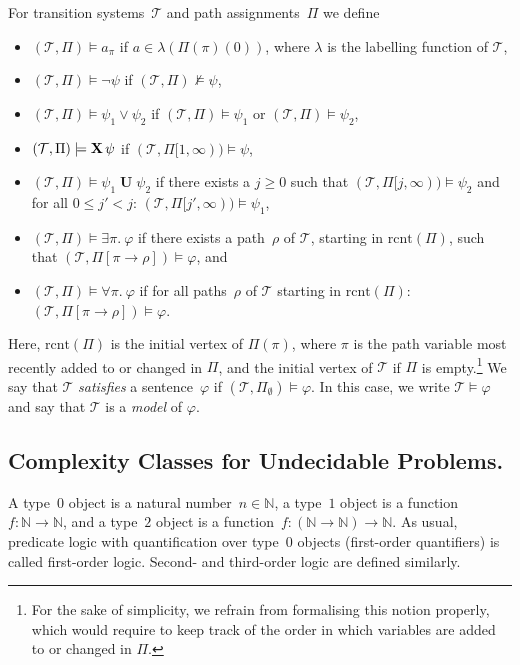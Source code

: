 \documentclass[dvipsnames,10pt,a4paper]{amsart}
\theoremstyle{definition}
\theoremstyle{remark}
\newcommand{\last}{\mathrm{rcnt}}
\newcommand{\nats}{\mathbb{N}}
\renewcommand{\phi}{\varphi}
\newcommand{\tsys}{\mathcal{T}}
\DeclareMathOperator{\U}{\mathbf{U}}
\newcommand{\X}{\mathop{\mathbf{X}\vphantom{a}}\nolimits}
\newcommand{\suffix}[2]{#1[#2,\infty)}
\renewcommand{\phi}{\varphi}
\begin{document}
 For transition systems~$\tsys$ and path assignments~$\Pi$ we define 
\begin{itemize}
	\item $(\tsys, \Pi) \models a_\pi$ if $a \in \lambda(\Pi(\pi)(0))$, where $\lambda$ is the labelling function of $\tsys$,
	\item $(\tsys, \Pi) \models \neg \psi$ if $(\tsys, \Pi) \not\models \psi$,
	\item $(\tsys, \Pi) \models \psi_1 \vee \psi_2 $ if $(\tsys, \Pi) \models \psi_1$ or $(\tsys, \Pi) \models \psi_2$,
	\item $(\tsys, \Pi) \models \X \psi$ if $(\tsys,\suffix{\Pi}{1}) \models \psi$,
	\item $(\tsys, \Pi) \models \psi_1 \U \psi_2$ if there exists a $j \ge 0$ such that $(\tsys,\suffix{\Pi}{j}) \models \psi_2$ and for all $0 \le j' < j$: $(\tsys,\suffix{\Pi}{j'}) \models \psi_1$, 
	\item $(\tsys, \Pi) \models \exists \pi.\ \phi$ if there exists a path~$\rho$ of $\tsys$, starting in $\last(\Pi)$, such that $(\tsys,\Pi[\pi \rightarrow \rho]) \models \phi$, and 
	\item $(\tsys, \Pi) \models \forall \pi.\ \phi$ if for all paths~$\rho$ of $\tsys$ starting in $\last(\Pi)$: $(\tsys,\Pi[\pi \rightarrow \rho]) \models \phi$. 
\end{itemize}
Here, $\last(\Pi)$ is the initial vertex of $\Pi(\pi)$, where $\pi$ is the path variable most recently added to or changed in $\Pi$, and the initial vertex of $\tsys$ if $\Pi$ is empty.\footnote{For the sake of simplicity, we refrain from formalising this notion properly, which would require to keep track of the order in which variables are added to or changed in $\Pi$.}
We say that $\tsys$ \emph{satisfies} a sentence~$\phi$ if $(\tsys, \Pi_\emptyset) \models \phi$. In this case, we write $\tsys \models \phi$ and say that $\tsys$ is a \emph{model} of $\phi$. 

\subsection{Complexity Classes for Undecidable Problems.}
A type~$0$ object is a natural number~$n \in \nats$, a type~$1$ object is a function $f \colon \nats \rightarrow \nats$, and a type~$2$ object is a function~$f\colon (\nats \rightarrow \nats) \rightarrow \nats$.
As usual, predicate logic with quantification over type~$0$ objects (first-order quantifiers) is called first-order logic.
Second- and third-order logic are defined similarly.
\end{document}
